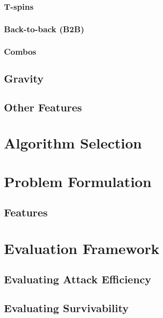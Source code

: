 \documentclass[a4paper, 12pt]{extreport}
\begin{document}
				\subsubsection{T-spins}
				
				\subsubsection{Back-to-back (B2B)}
				
				\subsubsection{Combos}
			
			\subsection{Gravity}
			
			\subsection{Other Features}
		
		\section{Algorithm Selection}
		
		\section{Problem Formulation}
		
			\subsection{Features}
		
		\section{Evaluation Framework}
			\subsection{Evaluating Attack Efficiency}
			
			\subsection{Evaluating Survivability}
			
\end{document}
